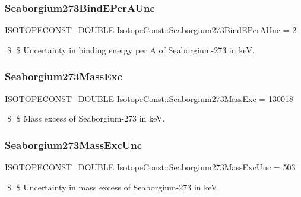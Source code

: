 \subsubsection{\texorpdfstring{Seaborgium273\+Bind\+E\+Per\+A\+Unc}{Seaborgium273BindEPerAUnc}}
{\footnotesize\ttfamily \mbox{\hyperlink{group___isotope_const-_macros_ga8f45a7272ce02c0b4c65c44636ed719a}{I\+S\+O\+T\+O\+P\+E\+C\+O\+N\+S\+T\+\_\+\+D\+O\+U\+B\+LE}} Isotope\+Const\+::\+Seaborgium273\+Bind\+E\+Per\+A\+Unc = 2}

\$ \$ Uncertainty in binding energy per A of Seaborgium-\/273 in keV. \mbox{\label{group___isotope_const-_seaborgium-_sg273_gaf59f0065326b100d3ca9ccc481c24484}} 
\subsubsection{\texorpdfstring{Seaborgium273\+Mass\+Exc}{Seaborgium273MassExc}}
{\footnotesize\ttfamily \mbox{\hyperlink{group___isotope_const-_macros_ga8f45a7272ce02c0b4c65c44636ed719a}{I\+S\+O\+T\+O\+P\+E\+C\+O\+N\+S\+T\+\_\+\+D\+O\+U\+B\+LE}} Isotope\+Const\+::\+Seaborgium273\+Mass\+Exc = 130018}

\$ \$ Mass excess of Seaborgium-\/273 in keV. \mbox{\label{group___isotope_const-_seaborgium-_sg273_ga6686e3b18807601a7fe5dd40b5a4702b}} 
\subsubsection{\texorpdfstring{Seaborgium273\+Mass\+Exc\+Unc}{Seaborgium273MassExcUnc}}
{\footnotesize\ttfamily \mbox{\hyperlink{group___isotope_const-_macros_ga8f45a7272ce02c0b4c65c44636ed719a}{I\+S\+O\+T\+O\+P\+E\+C\+O\+N\+S\+T\+\_\+\+D\+O\+U\+B\+LE}} Isotope\+Const\+::\+Seaborgium273\+Mass\+Exc\+Unc = 503}

\$ \$ Uncertainty in mass excess of Seaborgium-\/273 in keV. \mbox{\label{group___isotope_const-_seaborgium-_sg273_ga4a90620a93b453cf627ce51783838d87}} 
